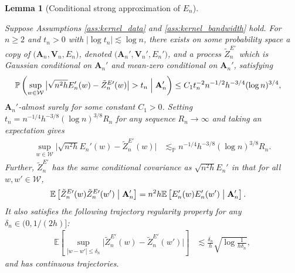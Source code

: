 \documentclass[11pt,lof]{puthesis}
\renewcommand{\P}{\ensuremath{\mathbb{P}}}
\newcommand{\E}{\ensuremath{\mathbb{E}}}
\newcommand{\bA}{\ensuremath{\mathbf{A}}}
\newcommand{\bV}{\ensuremath{\mathbf{V}}}
\newcommand{\cW}{\ensuremath{\mathcal{W}}}
\theoremstyle{break}
\newtheorem{lemma}{Lemma}[section]
\theoremstyle{proof}
\begin{document}
\begin{lemma}[Conditional strong approximation of $E_n$]
  \label{lem:kernel_app_conditional_strong_approx_En}

  Suppose Assumptions
  \ref{ass:kernel_data} and \ref{ass:kernel_bandwidth} hold.
  For $n \geq 2$
  and $t_n > 0$ with $\left|\log t_n\right| \lesssim \log n$,
  there exists on some probability space
  a copy of
  $\big(\bA_n, \bV_n, E_n\big)$,
  denoted $\big(\bA_n', \bV_n', E_n'\big)$, and a process $\tilde Z^{E\prime}_n$
  which is Gaussian conditional on $\bA_n'$ and mean-zero conditional on
  $\bA_n'$, satisfying
  \begin{align*}
    \P\left(
      \sup_{w \in \cW}
      \big|
      \sqrt{n^2h} E_n'(w) - \tilde Z_n^{E\prime}(w)
      \big|
      > t_n
      \Bigm\vert \bA_n'
    \right)
    &\leq
    C_1
    t_n^{-2}
    n^{-1/2}
    h^{-3/4}
    (\log n)^{3/4},
  \end{align*}
  $\bA_n'$-almost surely
  for some constant $C_1 > 0$.
  Setting $t_n = n^{-1/4} h^{-3/8} (\log n)^{3/8} R_n$
  for any sequence $R_n \to \infty$
  and taking an expectation gives
  \begin{align*}
    \sup_{w \in \cW}
    \big|
    \sqrt{n^2h} E_n'(w) - \tilde Z_n^{E\prime}(w)
    \big|
    &\lesssim_\P
    n^{-1/4}
    h^{-3/8} (\log n)^{3/8} R_n.
  \end{align*}
  Further,
  $\tilde Z_n^{E\prime}$ has the same conditional covariance as
  $\sqrt{n^2h} E_n'$ in that for all $w, w' \in \cW$,
  \begin{align*}
    \E\left[
      \tilde Z_n^{E\prime}(w)
      \tilde Z_n^{E\prime}(w')
      \bigm\vert \bA_n'
    \right]
    &=
    n^2h
    \E\left[
      E_n'(w)
      E_n'(w')
      \bigm\vert \bA_n'
    \right].
  \end{align*}
  It also satisfies the following
  trajectory regularity property
  for any $\delta_n \in (0, 1/(2h)]$:
  \begin{align*}
    \E\left[
      \sup_{|w-w'| \leq \delta_n}
      \big|
      \tilde Z_n^{E\prime}(w)
      - \tilde Z_n^{E\prime}(w')
      \big|
    \right]
    &\lesssim
    \frac{\delta_n}{h}
    \sqrt{\log \frac{1}{h\delta_n}},
  \end{align*}
  and has continuous trajectories.

\end{lemma}
\end{document}
